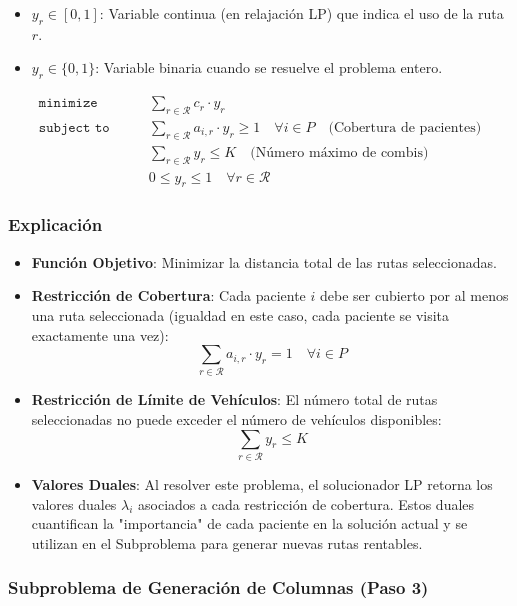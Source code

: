 \documentclass[12pt]{article}
\newcommand{\mini}{\texttt{minimize}\quad\,\,}
\newcommand{\subj}{\texttt{subject to}\quad}
\begin{document}
\begin{itemize}
    \item $y_r \in [0,1]$: Variable continua (en relajación LP) que indica el uso de la ruta $r$.
    \item $y_r \in \{0,1\}$: Variable binaria cuando se resuelve el problema entero.
\end{itemize}

\begin{align*}
  \mini & \sum_{r \in \mathcal{R}} c_r \cdot y_r \\
  \subj \quad
    & \sum_{r \in \mathcal{R}} a_{i,r} \cdot y_r \geq 1 \quad \forall i \in P \quad \text{(Cobertura de pacientes)} \\
    & \sum_{r \in \mathcal{R}} y_r \leq K \quad \text{(Número máximo de combis)} \\
    & 0 \leq y_r \leq 1 \quad \forall r \in \mathcal{R}
\end{align*}

\subsubsection*{Explicación}

\begin{itemize}
    \item \textbf{Función Objetivo}: Minimizar la distancia total de las rutas seleccionadas.
    
    \item \textbf{Restricción de Cobertura}: Cada paciente $i$ debe ser cubierto por al menos una ruta seleccionada (igualdad en este caso, cada paciente se visita exactamente una vez):
    \[
    \sum_{r \in \mathcal{R}} a_{i,r} \cdot y_r = 1 \quad \forall i \in P
    \]
    
    \item \textbf{Restricción de Límite de Vehículos}: El número total de rutas seleccionadas no puede exceder el número de vehículos disponibles:
    \[
    \sum_{r \in \mathcal{R}} y_r \leq K
    \]
    
    \item \textbf{Valores Duales}: Al resolver este problema, el solucionador LP retorna los valores duales $\lambda_i$ asociados a cada restricción de cobertura. Estos duales cuantifican la "importancia" de cada paciente en la solución actual y se utilizan en el Subproblema para generar nuevas rutas rentables.
\end{itemize}

\subsubsection{Subproblema de Generación de Columnas (Paso 3)}
\end{document}
